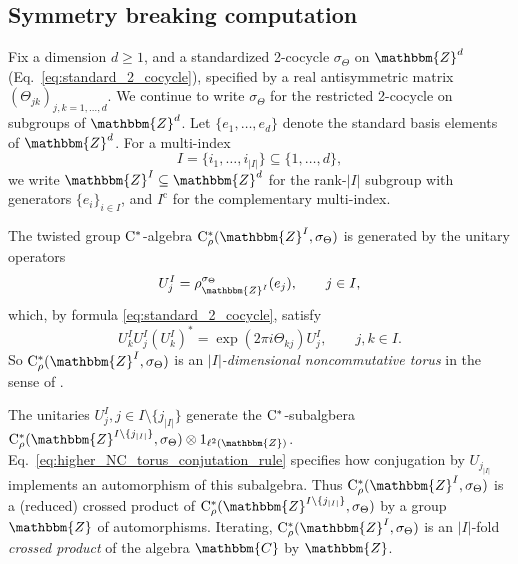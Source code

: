 \documentclass{amsart}
\numberwithin{figure}{section}
\numberwithin{equation}{section}
\numberwithin{table}{section}
\theoremstyle{plain}
\theoremstyle{definition}
\theoremstyle{remark}
\theoremstyle{nonumber}
\newcommand{\Z}{\mathbb{Z}}
\newcommand{\C}{\mathbb{C}}
\newcommand{\Cst}{\relax\ifmmode\mathrm{C}^*\else\textup{C*}\fi}
\newcommand{\Cstr}{\Cst_\rho} %
\renewcommand{\mathbb}{\mathbbm} %
\begin{document}
\subsection{Symmetry breaking computation}\label{sec:Euclidean.twisted.computation}
Fix a dimension $d\geq 1$, and a standardized 2-cocycle $\sigma_\Theta$ on $\Z^d$ (Eq.~\eqref{eq:standard_2_cocycle}), specified by a real antisymmetric matrix $(\Theta_{jk})_{j,k=1,\ldots,d}$. We continue to write $\sigma_\Theta$ for the restricted 2-cocycle on subgroups of $\Z^d$.
Let $\{e_1,\ldots,e_d\}$ denote the standard basis elements of $\Z^d$. For a multi-index
\[
I=\{i_1,\ldots,i_{|I|}\}\subseteq\{1,\ldots,d\},
\]
we write $\Z^I\subseteq\Z^d$ for the rank-$|I|$ subgroup with generators $\{e_i\}_{i\in I}$, and $I^\mathrm{c}$ for the complementary multi-index.

The twisted group $\Cst$-algebra $\Cstr(\Z^I,\sigma_\Theta)$ is generated by the unitary operators
\[
U^I_j=\rho_{\Z^I}^{\sigma_\Theta}(e_j),\qquad j\in I,
\]
which, by formula \eqref{eq:standard_2_cocycle}, satisfy
\begin{equation}\label{eq:higher_NC_torus_conjutation_rule}
U^I_k U^I_j (U^I_k)^*=\exp(2\pi i\Theta_{kj}) U^I_j,\qquad j,k\in I.
\end{equation} 
So $\Cstr(\Z^I,\sigma_\Theta)$ is an \emph{$|I|$-dimensional noncommutative
torus} in the sense of
\cites{Rieffel:Higher-dimensional_NC_tori,Elliott:Projective_representation_torsion-free}.

The unitaries $U^I_j, j\in I\setminus\{j_{|I|}\}$ generate the
$\Cst$-subalgbera
\mbox{$\Cstr(\Z^{I\setminus\{j_{|I|}\}},\sigma_\Theta)\otimes
1_{\ell^2(\Z)}$.} Eq.~\eqref{eq:higher_NC_torus_conjutation_rule} specifies
how conjugation by $U_{j_{|I|}}$ implements an automorphism of this
subalgebra. Thus $\Cstr(\Z^{I},\sigma_\Theta)$ is a (reduced) crossed
product of $\Cstr(\Z^{I\setminus\{j_{|I|}\}},\sigma_\Theta)$ by a group
$\Z$ of automorphisms.
Iterating, $\Cstr(\Z^I,\sigma_\Theta)$ is an $|I|$-fold \emph{crossed
product} of the algebra $\C$ by $\Z$.
\end{document}
